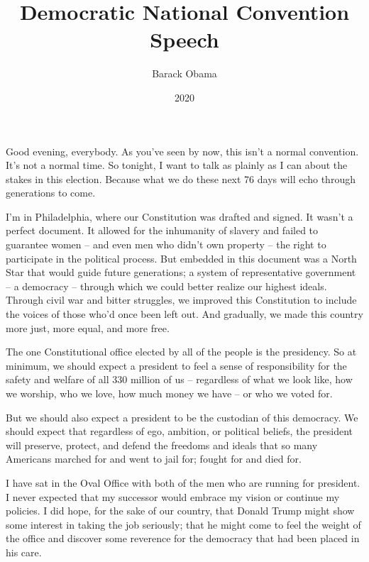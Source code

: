 \documentclass[10pt,a4paper]{article}
\begin{document}
\title{Democratic National Convention Speech}
\date{2020}
\author{Barack Obama}
\maketitle
    
\thispagestyle{plain}
\setcounter{page}{1}
\linenumbers
\noindent Good evening, everybody. As you've seen by now, this isn't a normal convention. It's not a normal time. So tonight, I want to talk as plainly as I can about the stakes in this election. Because what we do these next 76 days will echo through generations to come.

I'm in Philadelphia, where our Constitution was drafted and signed. It wasn't a perfect document. It allowed for the inhumanity of slavery and failed to guarantee women -- and even men who didn't own property -- the right to participate in the political process. But embedded in this document was a North Star that would guide future generations; a system of representative government -- a democracy -- through which we could better realize our highest ideals. Through civil war and bitter struggles, we improved this Constitution to include the voices of those who'd once been left out. And gradually, we made this country more just, more equal, and more free.

The one Constitutional office elected by all of the people is the presidency. So at minimum, we should expect a president to feel a sense of responsibility for the safety and welfare of all 330 million of us -- regardless of what we look like, how we worship, who we love, how much money we have -- or who we voted for.

But we should also expect a president to be the custodian of this democracy. We should expect that regardless of ego, ambition, or political beliefs, the president will preserve, protect, and defend the freedoms and ideals that so many Americans marched for and went to jail for; fought for and died for.

I have sat in the Oval Office with both of the men who are running for president. I never expected that my successor would embrace my vision or continue my policies. I did hope, for the sake of our country, that Donald Trump might show some interest in taking the job seriously; that he might come to feel the weight of the office and discover some reverence for the democracy that had been placed in his care.
\end{document}
